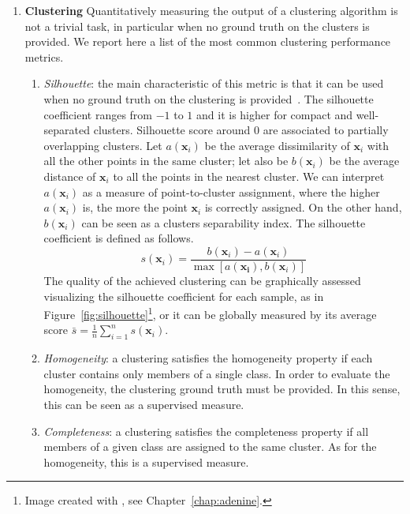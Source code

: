 \begin{enumerate}
        \item[] \textbf{Clustering} Quantitatively measuring the output of a clustering algorithm is not a trivial task, in particular when no ground truth on the clusters is provided. We report here a list of the most common clustering performance metrics.
        \begin{enumerate}[label=(\roman*)]
        	\item \textit{Silhouette}: the main characteristic of this metric is that it can be used when no ground truth on the clustering is provided~\cite{rousseeuw1987silhouettes}.
        	The silhouette coefficient ranges from $-1$ to $1$ and it is higher for compact and well-separated clusters. Silhouette score around $0$ are associated to partially overlapping clusters.
        	Let $a(\bm{x}_i)$ be the average dissimilarity of $\bm{x}_i$ with all the other points in the same cluster; let also be $b(\bm{x}_i)$ be the average distance of $\bm{x}_i$ to all the points in the nearest cluster. We can interpret $a(\bm{x}_i)$ as a measure of point-to-cluster assignment, where the higher $a(\bm{x}_i)$ is, the more the point $\bm{x}_i$ is correctly assigned. On the other hand, $b(\bm{x}_i)$ can be seen as a clusters separability index.
        	The silhouette coefficient is defined as follows.
        	\begin{equation} \label{eq:metrics_silhouette}
        	s(\bm{x}_i) = \frac{b(\bm{x}_i) - a(\bm{x}_i)}{\max[a(\bm{x_i}), b(\bm{x}_i)]}
        	\end{equation}
        	The quality of the achieved clustering can be graphically assessed visualizing the silhouette coefficient for each sample, as in Figure~\ref{fig:silhouette}\footnote{ Image created with \ade, see Chapter~\ref{chap:adenine}.}, or it can be globally measured by its average score $\bar s = \frac{1}{n}\sum_{i=1}^n s(\bm{x}_i)$.
        	
        	\item \textit{Homogeneity}: a clustering satisfies the homogeneity property if each cluster contains only members of a single class.
        	In order to evaluate the homogeneity, the clustering ground truth must be provided. In this sense, this can be seen as a supervised measure.
        	
        	\item \textit{Completeness}: a clustering satisfies the completeness property if all members of a given class are assigned to the same cluster.
        	As for the homogeneity, this is a supervised measure.
        	

\end{enumerate}
\end{enumerate}
